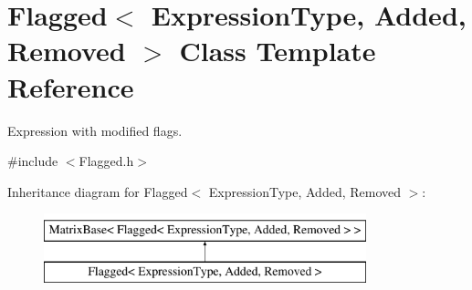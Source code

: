 \hypertarget{class_flagged}{\section{Flagged$<$ Expression\-Type, Added, Removed $>$ Class Template Reference}
\label{class_flagged}
}


Expression with modified flags.  




{\ttfamily \#include $<$Flagged.\-h$>$}

Inheritance diagram for Flagged$<$ Expression\-Type, Added, Removed $>$\-:\begin{figure}[H]
\begin{center}
\leavevmode
\includegraphics[height=2.000000cm]{class_flagged}
\end{center}
\end{figure}
